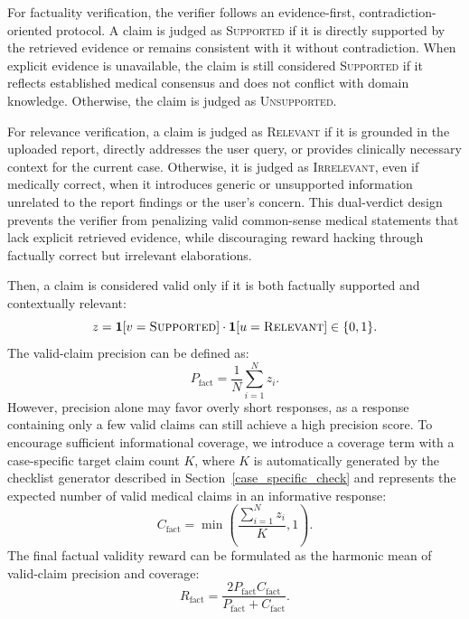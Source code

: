 \documentclass[letterpaper]{article} %
\begin{document}
For factuality verification, the verifier follows an evidence-first, contradiction-oriented protocol. A claim is judged as \textsc{Supported} if it is directly supported by the retrieved evidence or remains consistent with it without contradiction. When explicit evidence is unavailable, the claim is still considered \textsc{Supported} if it reflects established medical consensus and does not conflict with domain knowledge. Otherwise, the claim is judged as \textsc{Unsupported}.


For relevance verification, a claim is judged as \textsc{Relevant} if it is grounded in the uploaded report, directly addresses the user query, or provides clinically necessary context for the current case. Otherwise, it is judged as \textsc{Irrelevant}, even if medically correct, when it introduces generic or unsupported information unrelated to the report findings or the user's concern. This dual-verdict design prevents the verifier from penalizing valid common-sense medical statements that lack explicit retrieved evidence, while discouraging reward hacking through factually correct but irrelevant elaborations. 

Then, a claim is considered valid only if it is both factually supported and contextually relevant: 
\begin{equation}
z
=
\mathbf{1}[v=\textsc{Supported}]
\cdot
\mathbf{1}[u=\textsc{Relevant}]
\in
\{0,1\}.
\end{equation}
The valid-claim precision can be defined as:
\begin{equation}
P_{\mathrm{fact}}
=
\frac{1}{N}
\sum_{i=1}^{N} z_i.
\end{equation}
However, precision alone may favor overly short responses, as a response containing only a few valid claims can still achieve a high precision score. 
To encourage sufficient informational coverage, we introduce a coverage term with a case-specific target claim count $K$, where $K$ is automatically generated by the checklist generator described in Section~\ref{case_specific_check} and represents the expected number of valid medical claims in an informative response:
\begin{equation}
C_{\mathrm{fact}}
=
\min\!\left(
\frac{\sum_{i=1}^{N} z_i}{K}, 
1
\right).
\end{equation}
The final factual validity reward can be formulated as the harmonic mean of valid-claim precision and coverage: 
\begin{equation}
R_{\mathrm{fact}}
=
\frac{2P_{\mathrm{fact}}C_{\mathrm{fact}}}{P_{\mathrm{fact}}+C_{\mathrm{fact}}}.
\end{equation}
\end{document}
